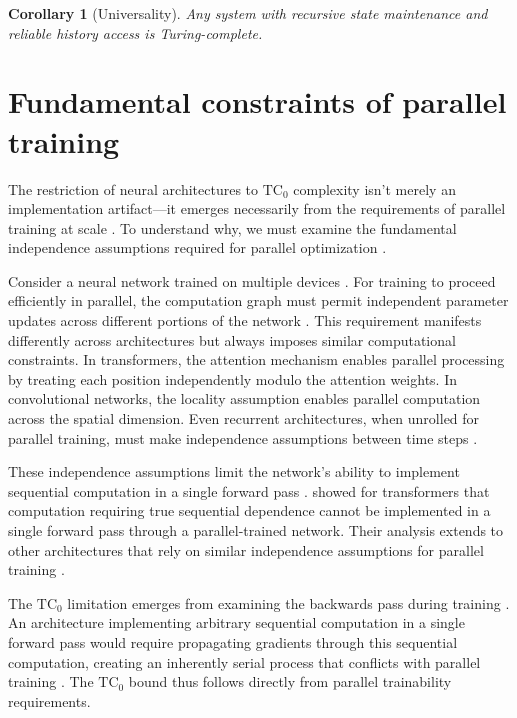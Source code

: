 \documentclass[12pt]{article}
\newtheorem{corollary}[theorem]{Corollary}
\begin{document}
\begin{corollary}[Universality]
Any system with recursive state maintenance and reliable history access is Turing-complete.
\end{corollary}

\section{Fundamental constraints of parallel training}

The restriction of neural architectures to $\text{TC}_0$ complexity isn't merely an implementation artifact---it emerges necessarily from the requirements of parallel training at scale \cite{merrill2023parallelism,peng2024limitations}. To understand why, we must examine the fundamental independence assumptions required for parallel optimization \cite{shallue2019measuring}.

Consider a neural network trained on multiple devices \cite{zhao2024epha}. For training to proceed efficiently in parallel, the computation graph must permit independent parameter updates across different portions of the network \cite{barrett2019analyzing}. This requirement manifests differently across architectures but always imposes similar computational constraints. In transformers, the attention mechanism enables parallel processing by treating each position independently modulo the attention weights. In convolutional networks, the locality assumption enables parallel computation across the spatial dimension. Even recurrent architectures, when unrolled for parallel training, must make independence assumptions between time steps \cite{dickson2023rnns}.

These independence assumptions limit the network's ability to implement sequential computation in a single forward pass \cite{wei2022chain}. \cite{merrill2023parallelism} showed for transformers that computation requiring true sequential dependence cannot be implemented in a single forward pass through a parallel-trained network. Their analysis extends to other architectures that rely on similar independence assumptions for parallel training \cite{stillman2023generative}.

The $\text{TC}_0$ limitation emerges from examining the backwards pass during training \cite{jung2020new}. An architecture implementing arbitrary sequential computation in a single forward pass would require propagating gradients through this sequential computation, creating an inherently serial process that conflicts with parallel training \cite{zhu2024overcoming}. The $\text{TC}_0$ bound thus follows directly from parallel trainability requirements.
\end{document}
